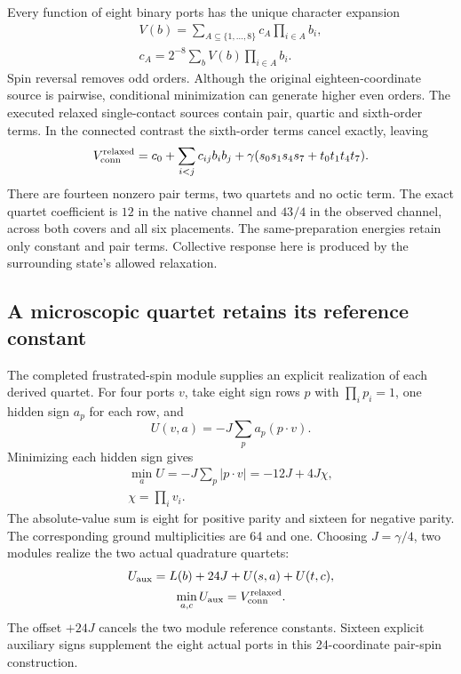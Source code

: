 Every function of eight binary ports has the unique character expansion
\[
\begin{gathered}
V(b)=\sum_{A\subseteq\{1,\ldots,8\}}c_A\prod_{i\in A}b_i,\\
 c_A=2^{-8}\sum_b V(b)\prod_{i\in A}b_i.
\end{gathered}
\]
Spin reversal removes odd orders. Although the original eighteen-coordinate
source is pairwise, conditional minimization can generate higher even
orders. The executed relaxed single-contact sources contain pair, quartic
and sixth-order terms. In the connected contrast the sixth-order terms
cancel exactly, leaving
\[
 V_{\rm conn}^{\rm relaxed}
 =c_0+\sum_{i<j}c_{ij}b_ib_j
 +\gamma(s_0s_1s_4s_7+t_0t_1t_4t_7).
\]
There are fourteen nonzero pair terms, two quartets and no octic term.
The exact quartet coefficient is \(12\) in the native channel and \(43/4\)
in the observed channel, across both covers and all six placements.
The same-preparation energies retain only constant and pair terms.
Collective response here is produced by the surrounding state's allowed
relaxation.

\subsection{A microscopic quartet retains its reference constant}

The completed frustrated-spin module supplies an explicit realization of
each derived quartet. For four ports \(v\), take eight sign rows \(p\) with
\(\prod_i p_i=1\), one hidden sign \(a_p\) for each row, and
\[
 U(v,a)=-J\sum_p a_p(p\cdot v).
\]
Minimizing each hidden sign gives
\[
\begin{gathered}
\min_aU=-J\sum_p|p\cdot v|=-12J+4J\chi,\\
 \chi=\prod_i v_i.
\end{gathered}
\]
The absolute-value sum is eight for positive parity and sixteen for negative
parity. The corresponding ground multiplicities are 64 and one. Choosing
\(J=\gamma/4\), two modules realize the two actual quadrature quartets:
\[
\begin{gathered}
U_{\rm aux}=L(b)+24J+U(s,a)+U(t,c),\\
 \min_{a,c}U_{\rm aux}=V_{\rm conn}^{\rm relaxed}.
\end{gathered}
\]
The offset \(+24J\) cancels the two module reference constants. Sixteen
explicit auxiliary signs supplement the eight actual ports in this
24-coordinate pair-spin construction.

